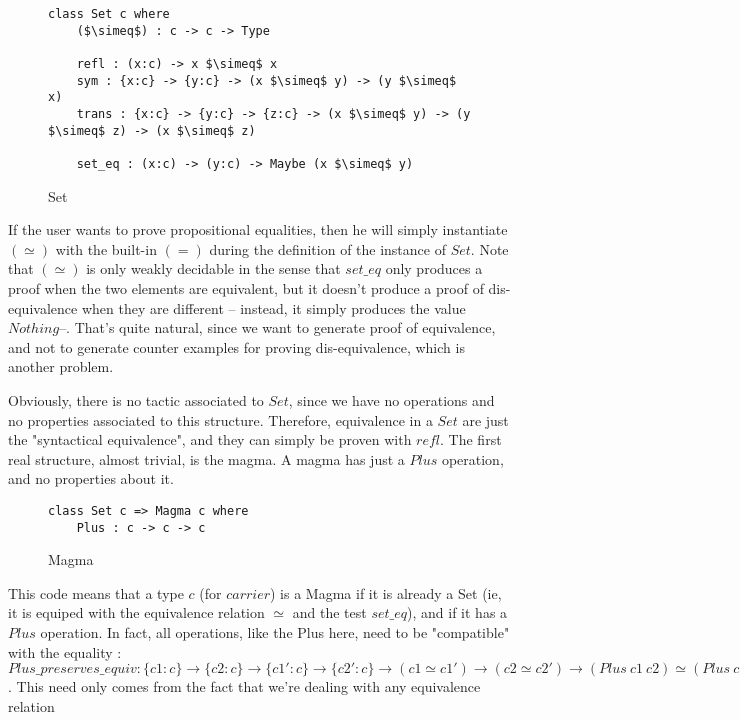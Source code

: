 \begin{figure}[H]
\figrule
\begin{center}
\begin{lstlisting}
class Set c where
    ($\simeq$) : c -> c -> Type

    refl : (x:c) -> x $\simeq$ x
    sym : {x:c} -> {y:c} -> (x $\simeq$ y) -> (y $\simeq$ x)
    trans : {x:c} -> {y:c} -> {z:c} -> (x $\simeq$ y) -> (y $\simeq$ z) -> (x $\simeq$ z)    
    
    set_eq : (x:c) -> (y:c) -> Maybe (x $\simeq$ y)
\end{lstlisting}
\end{center}
\caption{Set}
\figrule
\end{figure}
If the user wants to prove propositional equalities, then he will simply instantiate $(\simeq)$ with the built-in $(=)$ during the definition of the instance of $Set$.
Note that $(\simeq)$ is only weakly decidable in the sense that $set\_eq$ only produces a proof when the two elements are equivalent, but it doesn't produce a proof of dis-equivalence when they are different -- instead, it simply produces the value $Nothing$--. That's quite natural, since we want to generate proof of equivalence, and not to generate counter examples for proving dis-equivalence, which is another problem.

Obviously, there is no tactic associated to $Set$, since we have no operations and no properties associated to this structure. Therefore, equivalence in a $Set$ are just the "syntactical equivalence", and they can simply be proven with $refl$.
The first real structure, almost trivial, is the magma. A magma has just a $Plus$ operation, and no properties about it.

\begin{figure}[H]
\figrule
\begin{center}
\begin{lstlisting}
class Set c => Magma c where
    Plus : c -> c -> c
\end{lstlisting}
\end{center}
\caption{Magma}
\figrule
\end{figure}

This code means that a type $c$ (for $carrier$) is a Magma if it is already a Set (ie, it is equiped with the equivalence relation $\simeq$ and the test $set\_eq$), and if it has a $Plus$ operation.
In fact, all operations, like the Plus here, need to be "compatible" with the equality : $Plus\_preserves\_equiv : \{c1:c\} \rightarrow \{c2:c\} \rightarrow \{c1':c\} \rightarrow \{c2':c\} \rightarrow (c1 \simeq c1') \rightarrow (c2 \simeq c2') \rightarrow (Plus\ c1\ c2) \simeq (Plus\ c1'\ c2')$. This need only comes from the fact that we're dealing with any equivalence relation

